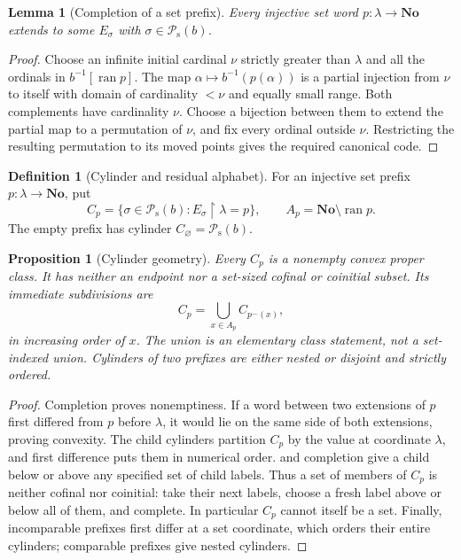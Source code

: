 \documentclass[11pt]{article}
\newtheorem{lemma}[lemma]{Lemma}
\newtheorem{proposition}[proposition]{Proposition}
\theoremstyle{definition}
\newtheorem{definition}[definition]{Definition}
\theoremstyle{remark}
\newcommand{\No}{\mathbf{No}}
\newcommand{\Psupp}{\mathcal P_{\mathrm{s}}}
\newcommand{\ran}{\operatorname{ran}}
\newcommand{\cat}{\mathbin{{}^\frown}}
\newcommand{\res}{\mathbin{\upharpoonright}}
\begin{document}
\begin{lemma}[Completion of a set prefix]\label{swo:tc:lem:completion}
Every injective set word $p:\lambda\to\No$ extends to some
$E_\sigma$ with $\sigma\in \Psupp(b)$.
\end{lemma}
\begin{proof}
Choose an infinite initial cardinal $\nu$ strictly greater than
$\lambda$ and all the ordinals in $b^{-1}[\ran p]$. The map
$\alpha\mapsto b^{-1}(p(\alpha))$ is a partial injection from $\nu$
to itself with domain of cardinality $<\nu$ and equally small range.
Both complements have cardinality $\nu$. Choose a bijection between
them to extend the partial map to a permutation of $\nu$, and fix every
ordinal outside $\nu$. Restricting the resulting permutation to its
moved points gives the required canonical code.
\end{proof}

\begin{definition}[Cylinder and residual alphabet]\label{swo:tc:n4.3}
For an injective set prefix $p:\lambda\to\No$, put
\[
 C_p=\{\sigma\in \Psupp(b):E_\sigma\res\lambda=p\},
 \qquad A_p=\No\setminus\ran p.
\]
The empty prefix has cylinder $C_\varnothing=\Psupp(b)$.
\end{definition}

\begin{proposition}[Cylinder geometry]\label{swo:tc:prop:cylinders}
Every $C_p$ is a nonempty convex proper class. It has neither an endpoint
nor a set-sized cofinal or coinitial subset. Its immediate subdivisions
are
\[
 C_p=\bigcup_{x\in A_p}C_{p\cat(x)},
\]
in increasing order of $x$. The union is an elementary class statement,
not a set-indexed union. Cylinders of two prefixes are either nested or
disjoint and strictly ordered.
\end{proposition}
\begin{proof}
Completion proves nonemptiness. If a word between two extensions of $p$
first differed from $p$ before $\lambda$, it would lie on the same side
of both extensions, proving convexity. The child cylinders partition
$C_p$ by the value at coordinate $\lambda$, and first difference puts
them in numerical order.  and completion give a
child below or above any specified set of child labels. Thus a set of
members of $C_p$ is neither cofinal nor coinitial: take their next
labels, choose a fresh label above or below all of them, and complete.
In particular $C_p$ cannot itself be a set. Finally, incomparable
prefixes first differ at a set coordinate, which orders their entire
cylinders; comparable prefixes give nested cylinders.
\end{proof}
\end{document}
